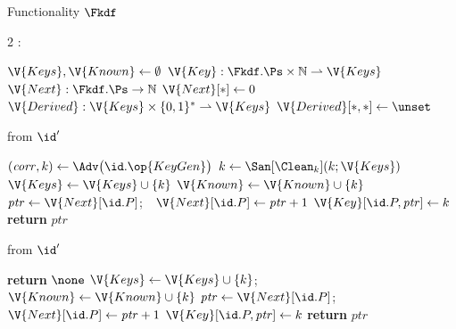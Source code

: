 \begin{interface}[nofloat]{Functionality $\Fkdf$ \\
\params{$\PID$, \quad $\Ps$, \quad $\admits$, \quad
$\uses := \{(\Adv,\serves)\}$, \quad $\pars := \none$}}

{\scriptsize
\setlength{\columnsep}{1.4em}
\begin{multicols}{2}
:
\begin{algorithmic}[1]
\setcounter{contline}{0}\algcont
\State $\V{Keys}, \V{Known} \gets \emptyset$
\State $\V{Key} : \Fkdf.\Ps \times \mathbb{N} \rightharpoonup \V{Keys}$
\State $\V{Next} : \Fkdf.\Ps \to \mathbb{N}$
\State $\V{Next}[*] \gets 0$
\State $\V{Derived} : \V{Keys} \times \{0,1\}^{*} \rightharpoonup \V{Keys}$
\State $\V{Derived}[*,*] \gets \unset$
\algsave
\end{algorithmic}
\vspace{1.4ex}

 \quad from $\id'$
\begin{algorithmic}[1]
\algcont
\State $(\mathit{corr}, k) \gets \Adv\bigl(\id.\op{KeyGen}\bigr)$
\State $k \gets \San[\Clean_{k}](k; \V{Keys})$
\State $\V{Keys} \gets \V{Keys} \cup \{k\}$
  \State $\V{Known} \gets \V{Known} \cup \{k\}$
\EndIf
\State $\mathit{ptr} \gets \V{Next}[\id.P]$;\ \ $\V{Next}[\id.P] \gets \mathit{ptr} + 1$
\State $\V{Key}[\id.P, \mathit{ptr}] \gets k$
\State \textbf{return} $\mathit{ptr}$
\algsave
\end{algorithmic}
\vspace{1.4ex}

 \quad from $\id'$
\begin{algorithmic}[1]
\algcont
{}
  \State \textbf{return} $\none$
\EndIf
\State $\V{Keys} \gets \V{Keys} \cup \{k\}$;\ \ $\V{Known} \gets \V{Known} \cup \{k\}$
\State $\mathit{ptr} \gets \V{Next}[\id.P]$;\ \ $\V{Next}[\id.P] \gets \mathit{ptr} + 1$
\State $\V{Key}[\id.P, \mathit{ptr}] \gets k$
\State \textbf{return} $\mathit{ptr}$
\algsave
\end{algorithmic}
\vspace{1.4ex}


\end{multicols}}
\end{interface}
